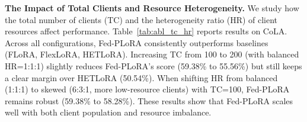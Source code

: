 \documentclass{article} %
\begin{document}
\begin{table}[h]
  \centering
  \caption{The impacts of the number of TC and clients' HR.}
  \renewcommand{\arraystretch}{1.2} 
  \label{tab:abl_tc_hr}
\end{table}


\textbf{The Impact of Total Clients and Resource Heterogeneity.} We study how the total number of clients (TC) and the heterogeneity ratio (HR) of client resources affect performance. Table~\ref{tab:abl_tc_hr} reports results on CoLA. Across all configurations, Fed-PLoRA consistently outperforms baselines (FLoRA, FlexLoRA, HETLoRA). Increasing TC from 100 to 200 (with balanced HR=1:1:1) slightly reduces Fed-PLoRA’s score (59.38\% to 55.56\%) but still keeps a clear margin over HETLoRA (50.54\%). When shifting HR from balanced (1:1:1) to skewed (6:3:1, more low-resource clients) with TC=100, Fed-PLoRA remains robust (59.38\% to 58.28\%). These results show that Fed-PLoRA scales well with both client population and resource imbalance. 
\end{document}
